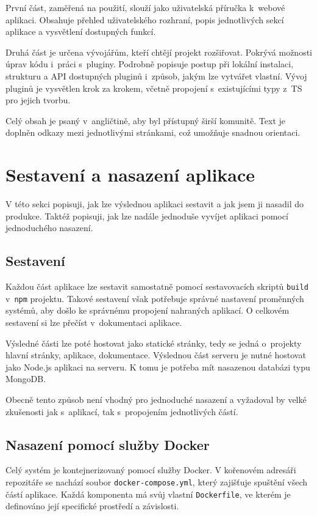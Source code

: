 První část, zaměřená na použití, slouží jako uživatelská příručka k~webové aplikaci. 
Obsahuje přehled uživatelského rozhraní, popis jednotlivých sekcí aplikace a vysvětlení dostupných funkcí. 

Druhá část je určena vývojářům, kteří chtějí projekt rozšiřovat. 
Pokrývá možnosti úprav kódu i~práci s~pluginy. 
Podrobně popisuje postup při lokální instalaci, strukturu a API dostupných pluginů i~způsob, jakým lze vytvářet vlastní. 
Vývoj pluginů je vysvětlen krok za krokem, včetně propojení s~existujícími typy z~TS pro jejich tvorbu.

Celý obsah je psaný v~angličtině, aby byl přístupný širší komunitě. 
Text je doplněn odkazy mezi jednotlivými stránkami, což umožňuje snadnou orientaci.

\section{Sestavení a nasazení aplikace}\label{text:realizace/nasazeni}

V této sekci popisuji, jak lze výslednou aplikaci sestavit a jak jsem ji nasadil do produkce.
Taktéž popisuji, jak lze nadále jednoduše vyvíjet aplikaci pomocí jednoduchého nasazení. 

\subsection{Sestavení}

Každou část aplikace lze sestavit samostatně pomocí sestavovacích skriptů \verb|build| v~\verb|npm| projektu.
Takové sestavení však potřebuje správné nastavení proměnných systémů, aby došlo ke správnému propojení nahraných aplikací.
O celkovém sestavení si lze přečíst v~dokumentaci aplikace.

Výsledné části lze poté hostovat jako statické stránky, tedy se jedná o~projekty hlavní stránky, aplikace, dokumentace.
Výslednou část serveru je nutné hostovat jako Node.js aplikaci na serveru.
K tomu je potřeba mít nasazenou databázi typu MongoDB.

Obecně tento způsob není vhodný pro jednoduché nasazení a vyžadoval by velké zkušenosti jak s~aplikací, tak s~propojením jednotlivých částí. 

\subsection{Nasazení pomocí služby Docker}

Celý systém je kontejnerizovaný pomocí služby Docker.
V kořenovém adresáři repozitáře se nachází soubor \texttt{docker-compose.yml}, který zajišťuje spuštění všech částí aplikace. 
Každá komponenta má svůj vlastní \texttt{Dockerfile}, ve kterém je definováno její specifické prostředí a závislosti.

